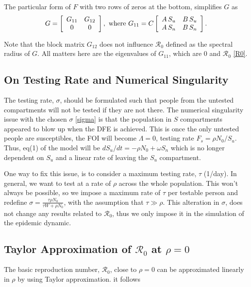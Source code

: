 \documentclass[12pt]{article}
\newcommand{\Rnum}{\mathcal{R}_0}
\theoremstyle{definition} %
\begin{document}
The particular form of $F$ with two rows of zeros at the bottom, simplifies $G$ as 
\begin{equation}
G = \left[ \begin {array}{cc}
G_{11}&G_{12}\\
0&0
\end {array} \right], \text{ where } \\
G_{11} =C
\left[\begin {array}{cc}
A\,S_u & B\,S_u\\
A\,S_n & B\,S_n
\end {array}\right].
\end{equation}

Note that the block matrix $G_{12}$ does not influence $\Rnum$ defined as the spectral radius of $G$. All matters here are the eigenvalues of $G_{11}$, which are 0 and $\Rnum$ \eqref{R0}.

\subsection{On Testing Rate and Numerical Singularity}
The testing rate, $\sigma$, should be formulated such that people from the untested compartments will not be tested if they are not there. The numerical singularity issue with the chosen $\sigma$ \eqref{sigma} is that the population in $S$ compartments appeared to blow up when the DFE is achieved. This is once the only untested people are susceptibles, the FOI will become $\Lambda=0$, testing rate $F_s=\rho N_0/S_u$. Thus, eq(1) of the model will be $d S_u/dt = - \rho N_0 + \omega S_n$ which is no longer dependent on $S_u$ and a linear rate of leaving the $S_u$ compartment.

One way to fix this issue, is to consider a maximum testing rate, $\tau$ (1/day). In general, we want to test at a rate of $\rho$ across the whole population. This won't always be possible, so we impose a maximum rate of $\tau$ per testable person and redefine $\sigma = \frac{\tau \rho N_0}{\tau W + \rho N_0}$, with the assumption that $\tau \gg \rho$. This alteration in $\sigma$, does not change any results related to $\Rnum$, thus we only impose it in the simulation of the epidemic dynamic.

\subsection{Taylor Approximation of $\Rnum$ at $\rho=0$ }

The basic reproduction number, $\Rnum$, close to $\rho=0$ can be approximated linearly in $\rho$ by using Taylor approximation. it follows
\end{document}
